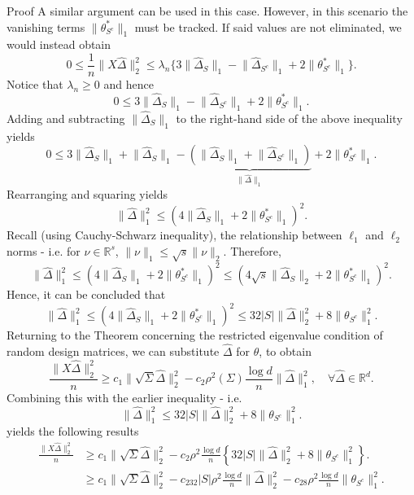 \documentclass[10pt,handout,english]{beamer}
\newcommand{\R}{\mathbb{R}}
\begin{document}
\begin{frame}[allowframebreaks]{Proof}
A similar argument can be used in this case. However, in this scenario the vanishing terms $\lVert\theta_{S^c}^*\rVert_1$ must be tracked. If said values are not eliminated, we would instead obtain
\[
0\leq\frac{1}{n}\lVert X\hat{\Delta}\rVert_2^2\leq \lambda_n \{3\lVert\hat{\Delta}_S\rVert_1-\lVert\hat{\Delta}_{S^c}\rVert_1+2\lVert\theta_{S^c}^*\rVert_1\}.
\]
Notice that $\lambda_n\geq 0$ and hence 
\[
0\leq 3\lVert\hat{\Delta}_S\rVert_1-\lVert\hat{\Delta}_{S^c}\rVert_1+2\lVert\theta_{S^c}^*\rVert_1.
\]
Adding and subtracting $\lVert\hat{\Delta}_S\rVert_1$ to the right-hand side of the above inequality yields
\[
0\leq 3\lVert\hat{\Delta}_S\rVert_1+\lVert\hat{\Delta}_S\rVert_1-\underbrace{(\lVert\hat{\Delta}_S\rVert_1+\lVert\hat{\Delta}_{S^c}\rVert_1)}_{\lVert\hat{\Delta}\rVert_1}+2\lVert\theta_{S^c}^*\rVert_1.
\]
Rearranging and squaring yields
\[
\lVert\hat{\Delta}\rVert_1^2\leq (4\lVert\hat{\Delta}_{S}\rVert_1+2\lVert\theta_{S^c}^*\rVert_1)^2.
\]
Recall (using Cauchy-Schwarz inequality), the relationship between $\ell_1$ and $\ell_2$ norms - i.e. for $\nu\in\R^s$, $\lVert \nu\rVert_1\leq \sqrt{s}\lVert\nu\rVert_2$. Therefore,
\[
\lVert\hat{\Delta}\rVert_1^2\leq (4\lVert\hat{\Delta}_{S}\rVert_1+2\lVert\theta_{S^c}^*\rVert_1)^2\leq (4\sqrt{s}\lVert\hat{\Delta}_{S}\rVert_2+2\lVert\theta_{S^c}^*\rVert_1)^2.
\]
Hence, it can be concluded that
\[
\lVert\hat{\Delta}\rVert_1^2\leq (4\lVert\hat{\Delta}_{S}\rVert_1+2\lVert\theta_{S^c}^*\rVert_1)^2\leq 32\lvert S\rvert\lVert\hat{\Delta}\rVert_2^2+8\lVert\theta_{S^c}\rVert_1^2.
\]
Returning to the Theorem concerning the restricted eigenvalue condition of random design matrices, we can substitute $\hat{\Delta}$ for $\theta$, to obtain
\[
\frac{\lVert X\hat{\Delta}\rVert_2^2}{n}\geq c_1\lVert\sqrt{\Sigma}\hat{\Delta}\rVert_2^2-c_2\rho^2(\Sigma)\frac{\log d}{n}\lVert\hat{\Delta}\rVert_1^2,\quad\forall\hat{\Delta}\in\R^d.
\]
Combining this with the earlier inequality - i.e. 
\[
\lVert\hat{\Delta}\rVert_1^2\leq 32\lvert S\rvert\lVert\hat{\Delta}\rVert_2^2+8\lVert\theta_{S^c}\rVert_1^2.
\] 
yields the following results
\begin{align*}
\frac{\lVert X\hat{\Delta}\rVert_2^2}{n}&\geq c_1\lVert\sqrt{\Sigma}\hat{\Delta}\rVert_2^2-c_2\rho^2\frac{\log d}{n}\left\{32\lvert S\rvert\lVert\hat{\Delta}\rVert_2^2+8\lVert\theta_{S^c}\rVert_1^2\right\}.\\
&\geq c_1\lVert\sqrt{\Sigma}\hat{\Delta}\rVert_2^2-c_232\lvert S\rvert\rho^2\frac{\log d}{n}\lVert\hat{\Delta}\rVert_2^2-c_28\rho^2\frac{\log d}{n}\lVert\theta_{S^c}\rVert_1^2.
\end{align*}

\end{frame}
\end{document}
